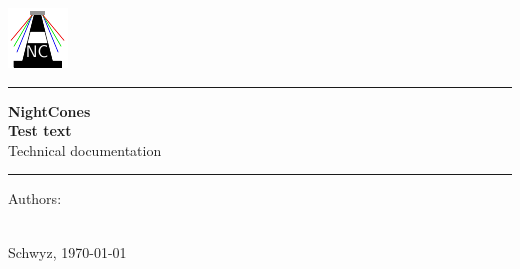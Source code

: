 \begin{titlepage}

    \vspace{4mm}

    \begin{center}
        \includegraphics[scale=6]{img/NC_Logo.pdf}
    \end{center} 


    \begin{center}
        \rule{\textwidth}{2pt}
    \end{center}

    \vspace{2mm}

    \begin{center}
      \huge{\textbf{NightCones}}\\
      \LARGE{\textbf{Test text}}\\
        \vspace{4mm}
        \Large{Technical documentation}
    \end{center}
    

    \begin{center}
        \rule{\textwidth}{2pt}
    \end{center}

    \vspace{4mm}

    \begin{center}
        Authors:\\
        \large{\makeatletter \@author \makeatother}\\
        \vspace{4mm}
    \end{center}

    \vspace{3mm}

    \begin{center}
        Schwyz, \today
    \end{center}

\end{titlepage}
\clearpage
